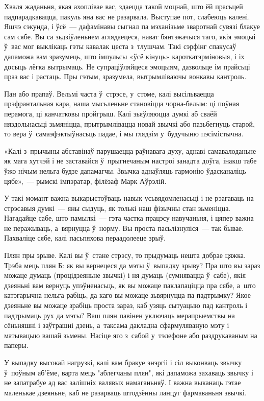 Хваля жаданьня, якая ахоплівае вас, здаецца такой моцнай, што ёй прасьцей падпарадкавацца, пакуль яна вас не разарвала. Выступае пот, слабеюць калені. Яшчэ сэкунда, і ўсё~--- дафамінавы сыгнал па мэханізьме зваротнай сувязі блакуе сам сябе. Вы са зьдзіўленьнем аглядаецеся, нават бянтэжачыся таго, якія эмоцыі ў~вас мог выклікаць гэты кавалак цеста з~тлушчам. Такі сэрфінг спакусаў дапаможа вам зразумець, што імпульсы «ўсё кінуць» кароткатэрміновыя, і іх досыць лёгка вытрымаць. Не супраціўляйцеся эмоцыям, дазвольце ім прайсьці праз вас і растаць. Пры гэтым, зразумела, вытрымліваючы вонкавы кантроль.

Пан або прапаў. Вельмі часта ў~стрэсе, у~стоме, калі высільваецца прэфрантальная кара, наша мысьленьне становіцца чорна-белым: ці поўная перамога, ці канчатковы пройгрыш. Калі зьяўляюцца думкі аб сваёй няздольнасьці зьмяніцца, прытрымлівацца новай звычкі або пазьбегнуць старой, то вера ў~самаэфэктыўнасьць падае, і мы глядзім у~будучыню пэсімістычна.

«Калі з~прычыны абставінаў парушаецца раўнавага духу, аднаві самавалоданьне як мага хутчэй і не заставайся ў~прыгнечаным настроі занадта доўга, інакш табе ўжо нічым нельга будзе дапамагчы. Звычка аднаўляць гармонію ўдасканаліць цябе»,~--- рымскі імпэратар, філёзаф Марк Аўрэлій.

У такі момант важна выкарыстоўваць навык усьвядомленасьці і не рэагаваць на стрэсавыя думкі~--- яны сыдуць, як толькі наш фізычны стан зьменіцца. Нагадайце сабе, што памылкі~--- гэта частка працэсу навучаньня, і цяпер важна не перажываць, а~вярнуцца ў~норму. Вы проста пасьлізнуліся~--- так бывае. Пахваліце сябе, калі пасьпяхова пераадолееце зрыў.

Плян пры зрыве. Калі вы ў~стане стрэсу, то прыдумаць нешта добрае цяжка. Трэба мець плян Б: як вы вернецеся да мэты ў~выпадку зрыву? Пра што вы зараз можаце думаць (процідзеяньне звычкі) і ня думаць (сумнявацца ў~сабе), якія дзеяньні вам вернуць упэўненасьць, як вы можаце паклапаціцца пра сябе, а~што катэгарычна нельга рабіць, да каго вы можаце зьвярнуцца па падтрымку? Якое дзеяньне вы можаце зрабіць проста зараз, каб узяць сытуацыю пад кантроль і падтрымаць рух да мэты? Ваш плян павінен уключаць мерапрыемствы на сёньняшні і заўтрашні дзень, а~таксама дакладна сфармуляваную мэту і матывацыю вашай зьмены. Насіце яго з~сабой у~тэлефоне або раздрукаваным на паперы.

У выпадку высокай нагрузкі, калі вам бракуе энэргіі і сіл выконваць звычку ў~поўным аб'ёме, варта мець "аблегчаны плян", які дапаможа захаваць звычку і не запатрабуе ад вас залішніх валявых намаганьняў. І важна выканаць гэтае маленькае дзеяньне, каб не разарваць штодзённы ланцуг фармаваньня звычкі.

